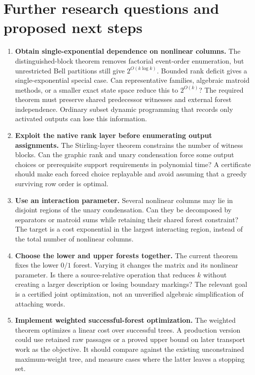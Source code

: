 \section{Further research questions and proposed next steps}
\label{sec:future}

\begin{enumerate}[leftmargin=*,label=\textbf{\arabic*.}]
\item \textbf{Obtain single-exponential dependence on nonlinear columns.}
The distinguished-block theorem removes factorial event-order enumeration,
but unrestricted Bell partitions still give $2^{O(k\log k)}$. Bounded
rank deficit gives a single-exponential special case. Can representative
families, algebraic matroid methods, or a smaller exact state space reduce
this to $2^{O(k)}$? The required theorem must preserve shared predecessor
witnesses and external forest independence. Ordinary subset dynamic
programming that records only activated outputs can lose this information.

\item \textbf{Exploit the native rank layer before enumerating output assignments.}
The Stirling-layer theorem constrains the number of witness blocks. Can
the graphic rank and unary condensation force some output choices or
prerequisite support requirements in polynomial time? A certificate should make
each forced choice replayable and avoid assuming that a greedy surviving
row order is optimal.

\item \textbf{Use an interaction parameter.}
Several nonlinear columns may lie in disjoint regions of the unary
condensation. Can they be decomposed by separators or matroid sums while
retaining their shared forest constraint? The target is a cost exponential
in the largest interacting region, instead of the total number of
nonlinear columns.

\item \textbf{Choose the lower and upper forests together.}
The current theorem fixes the lower $0/1$ forest. Varying it changes the
matrix and its nonlinear parameter. Is there a source-relative operation
that reduces $k$ without creating a larger description or losing boundary
markings? The relevant goal is a certified joint optimization, not an
unverified algebraic simplification of attaching words.

\item \textbf{Implement weighted successful-forest optimization.}
The weighted theorem optimizes a linear cost over successful trees. A
production version could use retained raw passages or a proved upper
bound on later transport work as the objective. It should compare against
the existing unconstrained maximum-weight tree, and measure cases where
the latter leaves a stopping set.


\end{enumerate}
